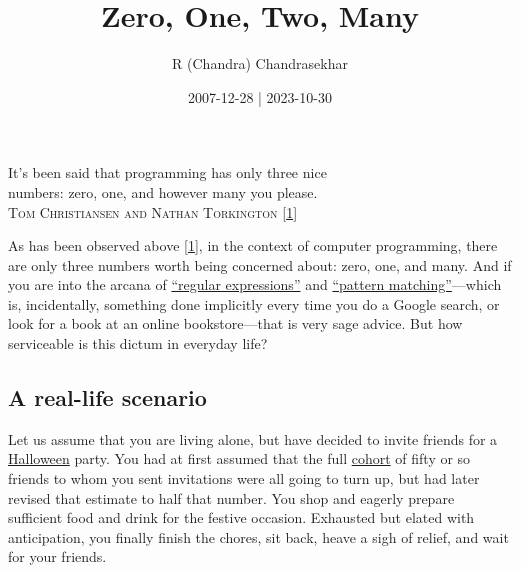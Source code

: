 \documentclass[
  a4paper,
]{article}
\title{Zero, One, Two, Many}
\author{R (Chandra) Chandrasekhar}
\date{2007-12-28 | 2023-10-30}
\begin{document}
\maketitle

\thispagestyle{empty}


\begin{flushright}

\begin{footnotesize}

It's been said that programming has only three nice\\
numbers: zero, one, and however many you please.\\
\textsc{Tom Christiansen and Nathan Torkington}
{[}\protect\hyperlink{ref-perlcookbook2003}{1}{]}

\end{footnotesize}

\end{flushright}

\hfill\break
As has been observed above
{[}\protect\hyperlink{ref-perlcookbook2003}{1}{]}, in the context of
computer programming, there are only three numbers worth being concerned
about: zero, one, and many. And if you are into the arcana of
\href{https://developer.mozilla.org/en-US/docs/Web/JavaScript/Guide/Regular_expressions}{``regular
expressions''} and
\href{https://www.google.com/search?q=pattern+matching}{``pattern
matching''}---which is, incidentally, something done implicitly every
time you do a Google search, or look for a book at an online
bookstore---that is very sage advice. But how serviceable is this dictum
in everyday life?

\hypertarget{a-real-life-scenario}{%
\subsection{A real-life scenario}\label{a-real-life-scenario}}

Let us assume that you are living alone, but have decided to invite
friends for a
\href{https://www.britannica.com/topic/Halloween}{Halloween} party. You
had at first assumed that the full
\href{https://www.vocabulary.com/dictionary/cohort}{cohort} of fifty or
so friends to whom you sent invitations were all going to turn up, but
had later revised that estimate to half that number. You shop and
eagerly prepare sufficient food and drink for the festive occasion.
Exhausted but elated with anticipation, you finally finish the chores,
sit back, heave a sigh of relief, and wait for your friends.
\end{document}
